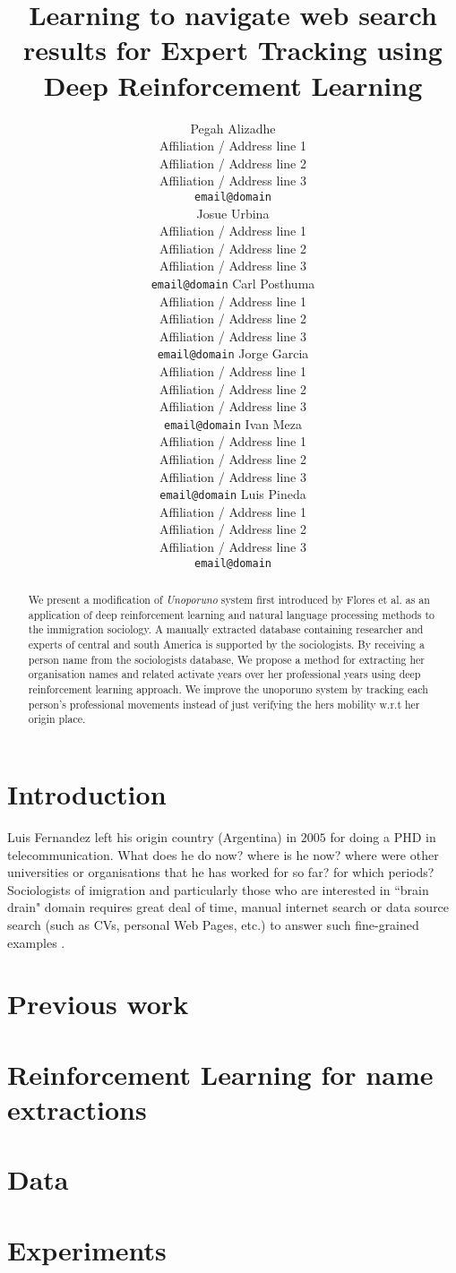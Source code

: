 \documentclass[11pt,a4paper]{article}
\title{Learning to navigate web search results for Expert Tracking using Deep Reinforcement Learning}
\author{Pegah Alizadhe \\
  Affiliation / Address line 1 \\
  Affiliation / Address line 2 \\
  Affiliation / Address line 3 \\
  {\tt email@domain} \\\And
  Josue Urbina \\
  Affiliation / Address line 1 \\
  Affiliation / Address line 2 \\
  Affiliation / Address line 3 \\
  {\tt email@domain}
  Carl Posthuma \\
  Affiliation / Address line 1 \\
  Affiliation / Address line 2 \\
  Affiliation / Address line 3 \\
  {\tt email@domain} 
  Jorge Garcia \\
  Affiliation / Address line 1 \\
  Affiliation / Address line 2 \\
  Affiliation / Address line 3 \\
  {\tt email@domain} 
  Ivan Meza \\
  Affiliation / Address line 1 \\
  Affiliation / Address line 2 \\
  Affiliation / Address line 3 \\
  {\tt email@domain} 
  Luis Pineda \\
  Affiliation / Address line 1 \\
  Affiliation / Address line 2 \\
  Affiliation / Address line 3 \\
  {\tt email@domain}
  \\}
\date{}
\begin{document}
\maketitle
\begin{abstract}
We present a modification of \textit{Unoporuno} system first introduced by Flores et al. \citep{Flores2012} as an application of deep reinforcement learning and natural language processing methods to the immigration sociology. A manually extracted database containing researcher and experts of central and south America is supported by the sociologists. By receiving a person name from the sociologists database, We propose a method for extracting her organisation names and related activate years over her professional years using deep reinforcement learning approach. We improve the unoporuno system by tracking each person's professional movements instead of just verifying the hers mobility w.r.t her origin place. 
\end{abstract}

\section{Introduction}
Luis Fernandez left his origin country (Argentina) in  $2005$ for doing a PHD in telecommunication. What does he do now? where is he now? where were other universities or organisations that he has worked for so far? for which periods? Sociologists of imigration and particularly those who are interested in ``brain drain" domain requires great deal of time, manual internet search or data source search (such as CVs, personal Web Pages, etc.) to answer such fine-grained examples \cite{Auriol2010,Meyer2006}. 


\section{Previous work}


\section{Reinforcement Learning for name extractions}


\section{Data}

\section{Experiments}
\end{document}
